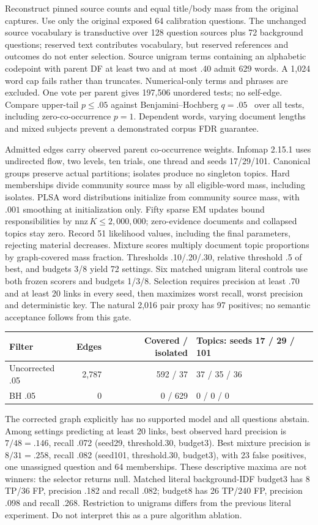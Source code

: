 \documentclass[11pt]{article}
\begin{document}
Reconstruct pinned source counts and equal title/body mass from the original
captures. Use only the original exposed 64 calibration questions. The unchanged
source vocabulary is transductive over 128 question sources plus 72 background
questions; reserved text contributes vocabulary, but reserved references and
outcomes do not enter selection. Source unigram terms containing an alphabetic
codepoint with parent DF at least two and at most .40 admit 629 words. A 1,024
word cap fails rather than truncates. Numerical-only terms and phrases are
excluded. One vote per parent gives 197,506 unordered tests; no self-edge.
Compare upper-tail $p\le .05$ against Benjamini--Hochberg $q=.05$~\cite{bh1995}
over all tests, including zero-co-occurrence $p=1$. Dependent words, varying
document lengths and mixed subjects prevent a demonstrated corpus FDR guarantee.

Admitted edges carry observed parent co-occurrence weights. Infomap 2.15.1 uses
undirected flow, two levels, ten trials, one thread and seeds 17/29/101.
Canonical groups preserve actual partitions; isolates produce no singleton
topics. Hard memberships divide community source mass by all eligible-word
mass, including isolates. PLSA word distributions initialize from community
source mass, with $.001$ smoothing at initialization only. Fifty sparse EM
updates bound responsibilities by $\mathrm{nnz}\,K\le2{,}000{,}000$; zero-evidence
documents and collapsed topics stay zero. Record 51 likelihood values, including
the final parameters, rejecting material decreases. Mixture scores multiply
document topic proportions by graph-covered mass fraction. Thresholds
.10/.20/.30, relative threshold .5 of best, and budgets 3/8 yield 72 settings.
Six matched unigram literal controls use both frozen scorers and budgets 1/3/8.
Selection requires precision at least .70 and at least 20 links in every seed,
then maximizes worst recall, worst precision and deterministic key. The natural
2,016 pair proxy has 97 positives; no semantic acceptance follows from this gate.

\begin{center}\small
\begin{tabular}{lrrl}\toprule
Filter & Edges & Covered / isolated & Topics: seeds 17 / 29 / 101\\\midrule
Uncorrected .05 & 2,787 & 592 / 37 & 37 / 35 / 36\\
BH .05 & 0 & 0 / 629 & 0 / 0 / 0\\\bottomrule
\end{tabular}\end{center}
The corrected graph explicitly has no supported model and all questions abstain.
Among settings predicting at least 20 links, best observed hard precision is
$7/48=.146$, recall .072 (seed29, threshold.30, budget3). Best mixture precision
is $8/31=.258$, recall .082 (seed101, threshold.30, budget3), with 23 false
positives, one unassigned question and 64 memberships. These descriptive maxima
are not winners: the selector returns null. Matched literal background-IDF
budget3 has 8 TP/36 FP, precision .182 and recall .082; budget8 has 26 TP/240 FP,
precision .098 and recall .268. Restriction to unigrams differs from the previous
literal experiment. Do not interpret this as a pure algorithm ablation.
\end{document}

